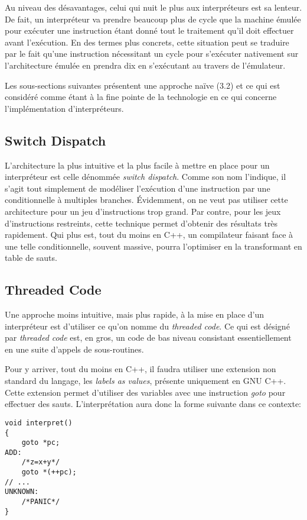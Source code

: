 \documentclass{article} %
\begin{document}
Au niveau des désavantages, celui qui nuit le plus aux interpréteurs est sa lenteur. De fait, un interpréteur va prendre beaucoup plus de cycle que la machine émulée pour exécuter une instruction étant donné tout le traitement qu'il doit effectuer avant l'exécution. En des termes plus concrets, cette situation peut se traduire par le fait qu'une instruction nécessitant un cycle pour s'exécuter nativement sur l'architecture émulée en prendra dix en s'exécutant au travers de l'émulateur.

Les sous-sections suivantes présentent une approche naïve (3.2) et ce qui est considéré comme étant à la fine pointe de la technologie en ce qui concerne l'implémentation d'interpréteurs.

\subsection{Switch Dispatch}
L'architecture la plus intuitive et la plus facile à mettre en place pour un interpréteur est celle dénommée \textit{switch dispatch}. Comme son nom l'indique, il s'agit tout simplement de modéliser l'exécution d'une instruction par une conditionnelle à multiples branches. Évidemment, on ne veut pas utiliser cette architecture pour un jeu d'instructions trop grand. Par contre, pour les jeux d'instructions restreints, cette technique permet d'obtenir des résultats très rapidement. Qui plus est, tout du moins en C++, un compilateur faisant face à une telle conditionnelle, souvent massive, pourra l'optimiser en la transformant en table de sauts. 

\subsection{Threaded Code}
Une approche moins intuitive, mais plus rapide, à la mise en place d'un interpréteur est d'utiliser ce qu'on nomme du \textit{threaded code}. Ce qui est désigné par \textit{threaded code} est, en gros, un code de bas niveau consistant essentiellement en une suite d'appels de sous-routines. 

Pour y arriver, tout du moins en C++, il faudra utiliser une extension non standard du langage, les \textit{labels as values}, présente uniquement en GNU C++. Cette extension permet d'utiliser des variables avec une instruction \textit{goto} pour effectuer des sauts. L'interprétation aura donc la forme suivante dans ce contexte:

\begin{lstlisting}
void interpret()
{
    goto *pc;
ADD:
    /*z=x+y*/
    goto *(++pc);
// ...
UNKNOWN:
    /*PANIC*/
}

\end{lstlisting}
\end{document}
